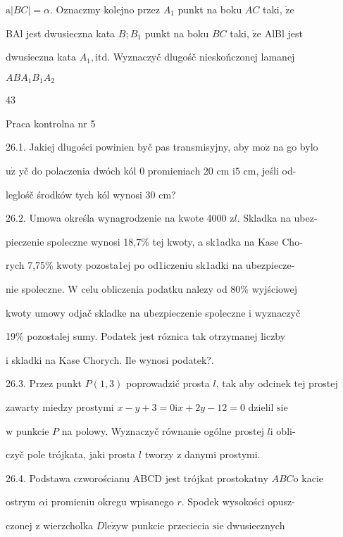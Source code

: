 \documentclass[a4paper,12pt]{article}
\begin{document}
$\mathrm{a}|BC|=\alpha$. Oznaczmy kolejno przez $A_{1}$ punkt na boku $AC$ taki, $\dot{\mathrm{z}}\mathrm{e}$

BAl jest dwusieczna kata $B;B_{1}$ punkt na boku $BC$ taki, $\dot{\mathrm{z}}\mathrm{e}$ AlBl jest

dwusieczna kata $A_{1}, \mathrm{i}\mathrm{t}\mathrm{d}$. Wyznaczyč dlugośč nieskończonej lamanej

$ABA_{1}B_{1}A_{2}$





43

Praca kontrolna nr 5

26.1. Jakiej dlugości powinien byč pas transmisyjny, aby $\mathrm{m}\mathrm{o}\dot{\mathrm{z}}$ na go bylo

$\mathrm{u}\dot{\mathrm{z}}$ yč do polaczenia dwóch kól $0$ promieniach 20 cm $\mathrm{i}5$ cm, jeśli od-

leglośč środków tych kól wynosi 30 cm?

26.2. Umowa określa wynagrodzenie na kwote 4000 $\mathrm{z}l$. Skladka na ubez-

pieczenie spoleczne wynosi 18,7\% tej kwoty, a sk1adka na Kase Cho-

rych 7,75\% kwoty pozosta1ej po od1iczeniu sk1adki na ubezpiecze-

nie spoleczne. $\mathrm{W}$ celu obliczenia podatku nalezy od 80\% wyjściowej

kwoty umowy odjač skladke na ubezpieczenie spoleczne $\mathrm{i}$ wyznaczyč

19\% pozostalej sumy. Podatek jest róznica tak otrzymanej liczby

$\mathrm{i}$ skladki na Kase Chorych. Ile wynosi podatek?.

26.3. Przez punkt $P(1,3)$ poprowadzič prosta $l$, tak aby odcinek tej prostej

zawarty miedzy prostymi $x-y+3=0\mathrm{i}x+2y-12=0$ dzielil $\mathrm{s}\mathrm{i}\mathrm{e}$

$\mathrm{w}$ punkcie $P$ na polowy. Wyznaczyč równanie ogólne prostej $l\mathrm{i}$ obli-

czyč pole trójkata, jaki prosta $l$ tworzy $\mathrm{z}$ danymi prostymi.

26.4. Podstawa czworościanu ABCD jest trójkat prostokatny $ABC\mathrm{o}$ kacie

ostrym $\alpha \mathrm{i}$ promieniu okregu wpisanego $r$. Spodek wysokości opusz-

czonej $\mathrm{z}$ wierzcholka $D \mathrm{l}\mathrm{e}\dot{\mathrm{z}}\mathrm{y}\mathrm{w}$ punkcie przeciecia $\mathrm{s}\mathrm{i}\mathrm{e}$ dwusiecznych
\end{document}
